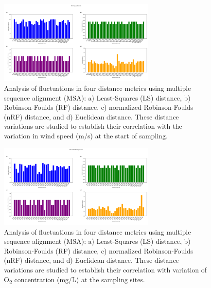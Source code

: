 \begin{figure}[]
    \centering
    \includegraphics[width=0.7\textwidth]{figure5.png}
     \caption{Analysis of fluctuations in four distance metrics using multiple sequence alignment (MSA): a) Least-Squares (LS) distance, b) Robinson-Foulds (RF) distance, c) normalized Robinson-Foulds (nRF) distance, and d) Euclidean distance. These distance variations are studied to establish their correlation with the variation in wind speed (m/s) at the start of sampling. \label{fig:fig6}}
\end{figure}

\begin{figure}[]
    \centering
    \includegraphics[width=0.7\textwidth]{figure6.png}
    \caption{Analysis of fluctuations in four distance metrics using multiple sequence alignment (MSA): a) Least-Squares (LS) distance, b) Robinson-Foulds (RF) distance, c) normalized Robinson-Foulds (nRF) distance, and d) Euclidean distance. These distance variations are studied to establish their correlation with variation of O\textsubscript{2} concentration (mg/L) at the sampling sites. \label{fig:fig7}}
\end{figure}

